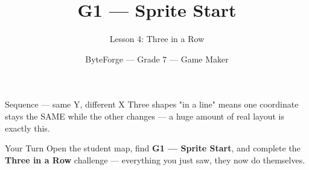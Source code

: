 \documentclass[aspectratio=169]{beamer}
\title{G1 — Sprite Start}
\subtitle{Lesson 4: Three in a Row}
\author{ByteForge --- Grade 7 --- Game Maker}
\date{}
\begin{document}
\begin{frame}
    \titlepage
\end{frame}

\begin{frame}{Sequence — same Y, different X}
    \Large
    Three shapes "in a line" means one coordinate stays the SAME while the other changes — a huge amount of real layout is exactly this.

    \begin{center}
    \end{center}
\end{frame}

\begin{frame}{Your Turn}
    \Large
    Open the student map, find \textbf{G1 — Sprite Start}, and complete
    the \textbf{Three in a Row} challenge --- everything you just saw, they now do themselves.
\end{frame}
\end{document}
